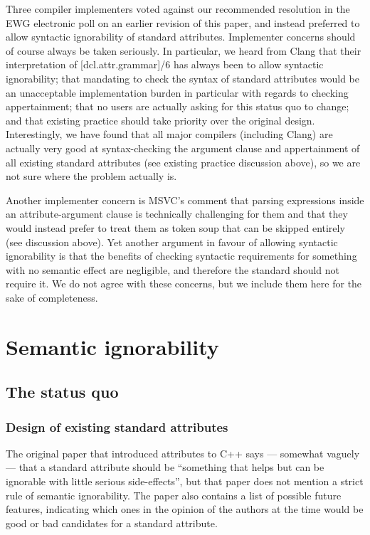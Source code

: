 Three compiler implementers voted against our recommended resolution in the EWG electronic poll on an earlier revision of this paper, and instead preferred to allow syntactic ignorability of standard attributes. Implementer concerns should of course always be taken seriously. In particular, we heard from Clang that their interpretation of [dcl.attr.grammar]/6 has always been to allow syntactic ignorability; that mandating to check the syntax of standard attributes would be an unacceptable implementation burden in particular with regards to checking appertainment;  that no users are actually asking for this status quo to change; and that existing practice should take priority over the original design. Interestingly, we have found that all major compilers (including Clang) are actually very good at syntax-checking the argument clause and appertainment of all existing standard attributes (see existing practice discussion above), so we are not sure where the problem actually is.

Another implementer concern is MSVC's comment that parsing expressions inside an attribute-argument clause is technically challenging for them and that they would instead prefer to treat them as token soup that can be skipped entirely (see discussion above). Yet another argument in favour of allowing syntactic ignorability is that the benefits of checking syntactic requirements for something with no semantic effect are negligible, and therefore the standard should not require it. We do not agree with these concerns, but we include them here for the sake of completeness.

\section{Semantic ignorability}
\label{sec:semantic}

\subsection{The status quo}

\subsubsection{Design of existing standard attributes}

The original paper that introduced attributes to C++ \cite{N2761} says --- somewhat vaguely --- that a standard attribute should be  ``something that helps but can be ignorable with little serious side-effects'', but that paper does not mention a strict rule of semantic ignorability. The paper also contains a list of possible future features, indicating which ones in the opinion of the authors at the time would be good or bad candidates for a standard attribute.

